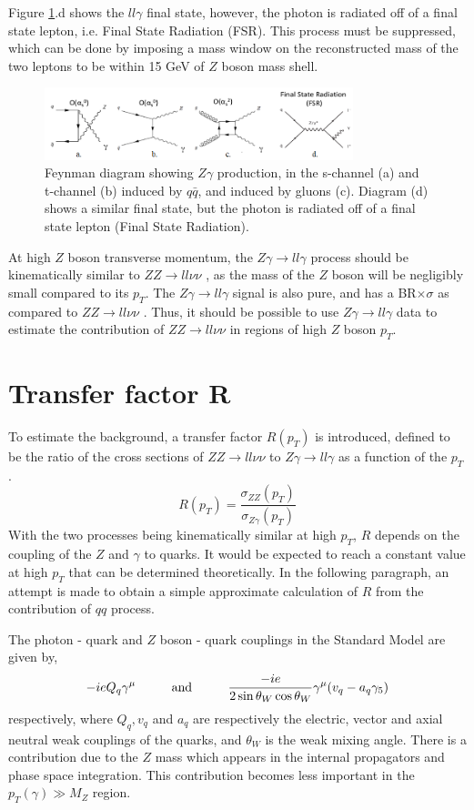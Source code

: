 \documentclass[11pt,a4paper,openright,twoside]{report}
\newcommand{\ZZ}{$ZZ\to ll\nu\nu$ }
\newcommand{\Zg}{$Z\gamma\to ll\gamma$ }
\begin{document}
Figure \ref{fig:Zg}.d shows the $ll\gamma$ final state, however, the photon is radiated off of a final state lepton, i.e. Final State Radiation (FSR). This process must be suppressed, which can be done by imposing a mass window on the reconstructed mass of the two leptons to be within 15 GeV of $Z$ boson mass shell.

\begin{figure}[H]
\centering
		\includegraphics[width=0.8\textwidth]{Zg.png}
		\caption{Feynman diagram showing $Z\gamma$ production, in the s-channel (a) and t-channel (b) induced by $q\bar{q}$, and induced by gluons (c). Diagram (d) shows a similar final state, but the photon is radiated off of a final state lepton (Final State Radiation).}
		\label{fig:Zg}
\end{figure}

At high $Z $ boson transverse momentum, the \Zg process should be kinematically similar to \ZZ, as the mass of the $Z$ boson will be negligibly small compared to its $p_T$. The \Zg signal is also pure, and has a BR$\times\sigma$ as compared to \ZZ. Thus, it should be possible to use \Zg data to estimate the contribution of \ZZ in regions of high $Z$ boson $p_T$.

\section{Transfer factor R}
To estimate the background, a transfer factor $R(p_T)$ is introduced, defined to be the ratio of the cross sections of \ZZ to \Zg as a function of the $p_T$.
\begin{equation}
	R(p_{T}) = \frac{\sigma_{ZZ}(p_{T})}{\sigma_{Z\gamma}(p_T)}
\end{equation}
With the two processes being kinematically similar at high $p_T$, $R$ depends on the coupling of the $Z$ and $\gamma$ to quarks. It would be expected to reach a constant value at high $p_T$ that can be determined theoretically. In the following paragraph, an attempt is made to obtain a simple approximate calculation of $R$ from the contribution of $qq$ process.

The photon - quark and $Z$ boson - quark couplings in the Standard Model are given by,
\begin{equation}
	-ieQ_q\gamma^{\mu} \hspace{1 cm} \text{and} \hspace{1 cm}\frac{-ie}{2 \sin\theta_W \cos\theta_W}\gamma^{\mu}(v_q - a_q\gamma_5)
\end{equation}
respectively, where $Q_q,v_q$ and $a_q$ are respectively the electric, vector and axial neutral weak couplings of the quarks, and $\theta_W$ is the weak mixing angle. There is a contribution due to the $Z$ mass which appears in the internal propagators and phase space integration. This contribution becomes less important in the $p_T(\gamma)\gg M_Z$ region.
\end{document}
